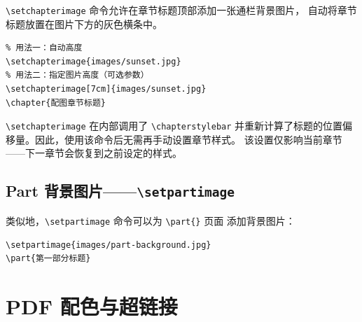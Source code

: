 
\lstinline|\setchapterimage| 命令允许在章节标题顶部添加一张通栏背景图片，
自动将章节标题放置在图片下方的灰色横条中。

\begin{lstlisting}
% 用法一：自动高度
\setchapterimage{images/sunset.jpg}
% 用法二：指定图片高度（可选参数）
\setchapterimage[7cm]{images/sunset.jpg}
\chapter{配图章节标题}
\end{lstlisting}

\begin{kaobox}[title=技术细节]
\lstinline|\setchapterimage| 在内部调用了 \lstinline|\chapterstylebar| %
并重新计算了标题的位置偏移量。因此，使用该命令后无需再手动设置章节样式。
该设置仅影响当前章节——下一章节会恢复到之前设定的样式。
\end{kaobox}


\subsection{Part 背景图片——\texttt{\textbackslash setpartimage}}

类似地，\lstinline|\setpartimage| 命令可以为 \lstinline|\part{}| 页面
添加背景图片：

\begin{lstlisting}
\setpartimage{images/part-background.jpg}
\part{第一部分标题}
\end{lstlisting}


\section{PDF 配色与超链接}


